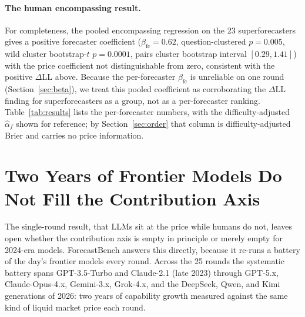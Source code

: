 \documentclass[11pt]{article}
\begin{document}
\paragraph{The human encompassing result.} For completeness, the pooled encompassing regression on the 23 superforecasters gives a positive forecaster coefficient ($\beta_{\mathrm{fc}}=0.62$, question-clustered $p=0.005$, wild cluster bootstrap-$t$ $p=0.0001$, pairs cluster bootstrap interval $[0.29,1.41]$) with the price coefficient not distinguishable from zero, consistent with the positive $\Delta$LL above. Because the per-forecaster $\beta_{\mathrm{fc}}$ is unreliable on one round (Section~\ref{sec:beta}), we treat this pooled coefficient as corroborating the $\Delta$LL finding for superforecasters as a group, not as a per-forecaster ranking. Table~\ref{tab:results} lists the per-forecaster numbers, with the difficulty-adjusted $\hat\alpha_f$ shown for reference; by Section~\ref{sec:order} that column is difficulty-adjusted Brier and carries no price information.

\begin{table}[t]\centering
\small

\caption{Market-track superforecasters, ordered by Brier rank. ``edge'' is the raw mean edge; $\hat\alpha_f$ is the difficulty-adjusted forecaster effect, which by Section~\ref{sec:order} equals difficulty-adjusted negative Brier and carries no price information; $^\ast$ marks the 7 forecasters with a positive edge surviving Benjamini--Hochberg control \citep{benjamini1995} at $q=0.10$. Labels F01--F23 anonymized; 56 market questions, single round.}
\label{tab:results}
\end{table}

\section{Two Years of Frontier Models Do Not Fill the Contribution Axis}
\label{sec:trend}
The single-round result, that LLMs sit at the price while humans do not, leaves open whether the contribution axis is empty in principle or merely empty for 2024-era models. ForecastBench answers this directly, because it re-runs a battery of the day's frontier models every round. Across the 25 rounds the systematic battery spans GPT-3.5-Turbo and Claude-2.1 (late 2023) through GPT-5.x, Claude-Opus-4.x, Gemini-3.x, Grok-4.x, and the DeepSeek, Qwen, and Kimi generations of 2026: two years of capability growth measured against the same kind of liquid market price each round.
\end{document}
